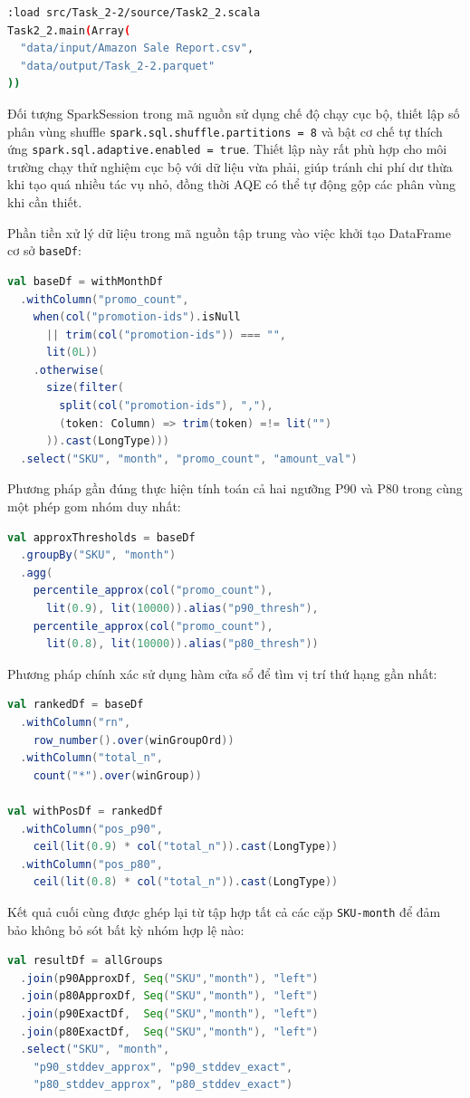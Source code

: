 \begin{lstlisting}[language=bash]
:load src/Task_2-2/source/Task2_2.scala
Task2_2.main(Array(
  "data/input/Amazon Sale Report.csv",
  "data/output/Task_2-2.parquet"
))
\end{lstlisting}

Đối tượng SparkSession trong mã nguồn sử dụng chế độ chạy cục bộ, thiết lập số phân vùng shuffle \texttt{spark.sql.shuffle.partitions = 8} và bật cơ chế tự thích ứng \texttt{spark.sql.adaptive.enabled = true}. Thiết lập này rất phù hợp cho môi trường chạy thử nghiệm cục bộ với dữ liệu vừa phải, giúp tránh chi phí dư thừa khi tạo quá nhiều tác vụ nhỏ, đồng thời AQE có thể tự động gộp các phân vùng khi cần thiết.

Phần tiền xử lý dữ liệu trong mã nguồn tập trung vào việc khởi tạo DataFrame cơ sở \texttt{baseDf}:
\begin{lstlisting}[language=Scala]
val baseDf = withMonthDf
  .withColumn("promo_count",
    when(col("promotion-ids").isNull
      || trim(col("promotion-ids")) === "",
      lit(0L))
    .otherwise(
      size(filter(
        split(col("promotion-ids"), ","),
        (token: Column) => trim(token) =!= lit("")
      )).cast(LongType)))
  .select("SKU", "month", "promo_count", "amount_val")
\end{lstlisting}

Phương pháp gần đúng thực hiện tính toán cả hai ngưỡng P90 và P80 trong cùng một phép gom nhóm duy nhất:
\begin{lstlisting}[language=Scala]
val approxThresholds = baseDf
  .groupBy("SKU", "month")
  .agg(
    percentile_approx(col("promo_count"),
      lit(0.9), lit(10000)).alias("p90_thresh"),
    percentile_approx(col("promo_count"),
      lit(0.8), lit(10000)).alias("p80_thresh"))
\end{lstlisting}

Phương pháp chính xác sử dụng hàm cửa sổ để tìm vị trí thứ hạng gần nhất:
\begin{lstlisting}[language=Scala]
val rankedDf = baseDf
  .withColumn("rn",
    row_number().over(winGroupOrd))
  .withColumn("total_n",
    count("*").over(winGroup))

val withPosDf = rankedDf
  .withColumn("pos_p90",
    ceil(lit(0.9) * col("total_n")).cast(LongType))
  .withColumn("pos_p80",
    ceil(lit(0.8) * col("total_n")).cast(LongType))
\end{lstlisting}

Kết quả cuối cùng được ghép lại từ tập hợp tất cả các cặp \texttt{SKU-month} để đảm bảo không bỏ sót bất kỳ nhóm hợp lệ nào:
\begin{lstlisting}[language=Scala]
val resultDf = allGroups
  .join(p90ApproxDf, Seq("SKU","month"), "left")
  .join(p80ApproxDf, Seq("SKU","month"), "left")
  .join(p90ExactDf,  Seq("SKU","month"), "left")
  .join(p80ExactDf,  Seq("SKU","month"), "left")
  .select("SKU", "month",
    "p90_stddev_approx", "p90_stddev_exact",
    "p80_stddev_approx", "p80_stddev_exact")
\end{lstlisting}

